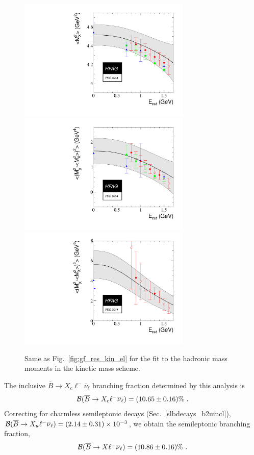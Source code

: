 \begin{figure}
\begin{center}
  \includegraphics[width=8.2cm]{figures/slb/h1_1.pdf}
  \includegraphics[width=8.2cm]{figures/slb/h2_1.pdf}\\
  \includegraphics[width=8.2cm]{figures/slb/h3_1.pdf}
\end{center}
\caption{Same as Fig.~\ref{fig:gf_res_kin_el} for the fit to the
  hadronic mass moments in the kinetic mass
  scheme.} \label{fig:gf_res_kin_mx}
\end{figure}

The inclusive $\bar B\to X_c\ell^-\bar\nu_\ell$ branching fraction
determined by this analysis is
\begin{equation}
  \cbf(\bar B\to X_c\ell^-\bar\nu_\ell)=(10.65\pm 0.16)\%~.
\end{equation}
Correcting for charmless semileptonic decays
(Sec.~\ref{slbdecays_b2uincl}), $\cbf(\bar B\to
X_u\ell^-\bar\nu_\ell)=(2.14\pm 0.31)\times 10^{-3}$, we obtain the
semileptonic branching fraction,
\begin{equation}
  \cbf(\bar B\to X\ell^-\bar\nu_\ell)=(10.86\pm 0.16)\%~.
\end{equation}

